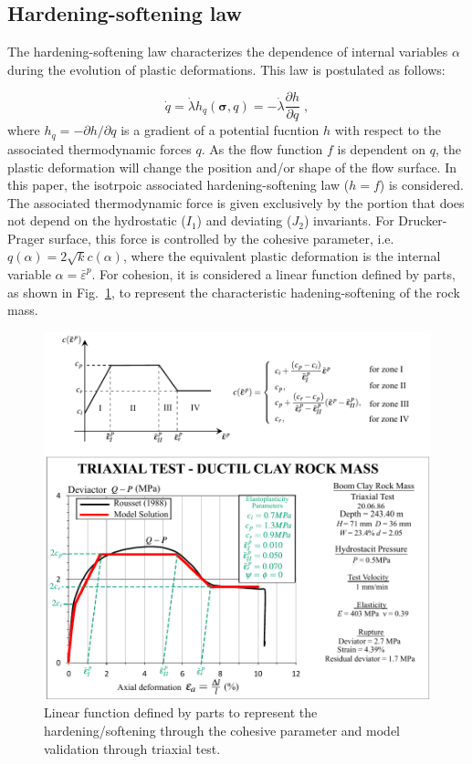 \documentclass[Journal,letterpaper]{ascelike-new}
\newcommand{\hl}{{h_q}}
\newcommand{\strainpeq}{\bar \varepsilon^p}
\newcommand{\stress}{\boldsymbol{\sigma}}
\begin{document}
\subsection{Hardening-softening law}

The hardening-softening law characterizes the dependence of internal variables $\alpha$ during the evolution of plastic deformations. This law is postulated as follows:

\begin{equation} \label{eq_hardening_law}
	\dot q = \dot \lambda \hl(\stress,q) = - \dot \lambda \dfrac{\partial h}{\partial q}\;,
\end{equation}
where $\hl = -\partial h / \partial q$ is a gradient of a potential fucntion $h$ with respect to the associated thermodynamic forces $q$. As the flow function $f$ is dependent on $q$, the plastic deformation will change the position and/or shape of the flow surface. In this paper, the isotrpoic associated hardening-softening law ($h=f$) is considered. The associated thermodynamic force is given exclusively by the portion that does not depend on the hydrostatic ($I_1$) and deviating ($J_2$) invariants. For Drucker-Prager surface, this force is controlled by the cohesive parameter, i.e. $q(\alpha) =  2\sqrt{k}c(\alpha)$, where the equivalent plastic deformation is the internal variable $\alpha = \strainpeq$. For cohesion, it is considered a linear function defined by parts, as shown in Fig.~\ref{choesive parameter}, to represent the characteristic hadening-softening of the rock mass.

\begin{figure}
	\centering
	\includegraphics[scale=1]{FIG1.pdf}
	\caption{Linear function defined by parts to represent the hardening/softening through the cohesive parameter and model validation through triaxial test.}
	\label{choesive parameter}
\end{figure}
\end{document}
